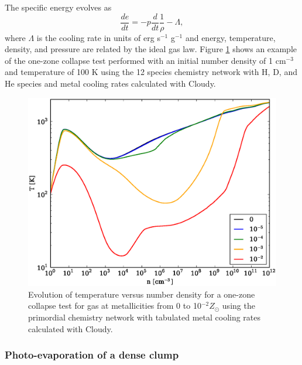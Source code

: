 The specific energy evolves as
\begin{equation}
\frac{de}{dt} = -p \frac{d}{dt} \frac{1}{\rho} - \Lambda,
\end{equation}
where $\Lambda$ is the cooling rate in units of erg s$^{-1}$ g$^{-1}$
and energy, temperature, density, and pressure are related by the
ideal gas law.  Figure \ref{fig.onezone} shows an example of the
one-zone collapse test performed with an initial number density of 1
cm$^{-3}$ and temperature of 100 K using the 12 species chemistry
network with H, D, and He species and metal cooling rates calculated
with Cloudy.

\begin{figure}
  \begin{center}
    \includegraphics[width=1.0\textwidth]{figures/OneZoneCollapseTest.eps}
  \end{center}
  \caption{Evolution of temperature versus number density for a one-zone
    collapse test for gas at metallicities from 0 to 10$^{-2} Z_{\odot}$
    using the primordial chemistry network with tabulated metal cooling
    rates calculated with Cloudy.}
  \label{fig.onezone}
\end{figure}


\subsubsection{Photo-evaporation of a dense clump}
\label{sec.tests.raytracing}


